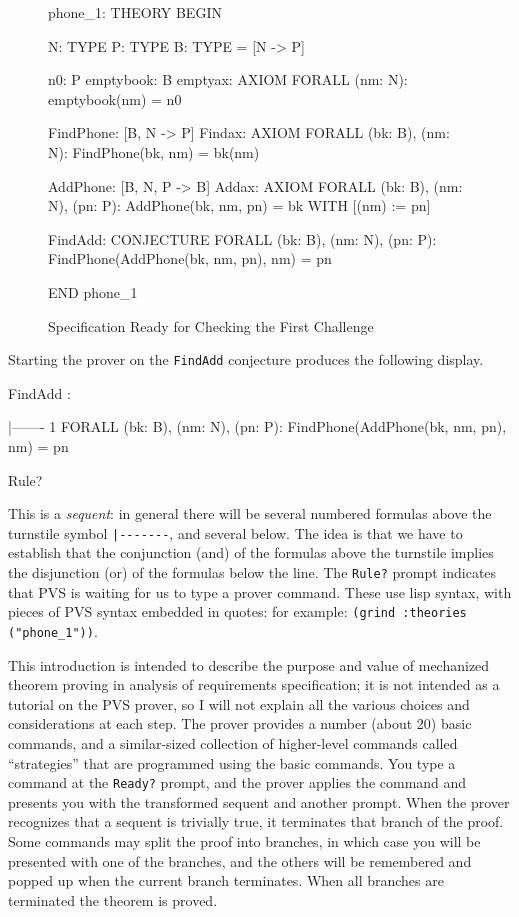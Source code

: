 \begin{figure}[htbp]
\begin{pvsexample}
phone_1: THEORY
BEGIN

  N: TYPE              %
  P: TYPE              %
  B: TYPE = [N -> P]   %

  n0: P
  emptybook: B
  emptyax: AXIOM   FORALL (nm: N): emptybook(nm) = n0

  FindPhone: [B, N -> P]
  Findax: AXIOM   FORALL (bk: B), (nm: N):  FindPhone(bk, nm) = bk(nm)

  AddPhone: [B, N, P -> B]
  Addax: AXIOM   FORALL (bk: B), (nm: N), (pn: P): 
     AddPhone(bk, nm, pn) = bk WITH [(nm) := pn]

  FindAdd: CONJECTURE  FORALL (bk: B), (nm: N), (pn: P):
    FindPhone(AddPhone(bk, nm, pn), nm) = pn

END phone_1
\end{pvsexample}
\caption{\label{fig1}Specification Ready for Checking the First Challenge}
\end{figure}

Starting the prover on the {\tt FindAdd} conjecture produces the following
display.
\begin{pvsexample}
FindAdd :  

  |-------
{1}   FORALL (bk: B), (nm: N), (pn: P): 
        FindPhone(AddPhone(bk, nm, pn), nm) = pn

Rule? 
\end{pvsexample}
This is a \emph{sequent}: in general there will be several numbered
formulas above the turnstile symbol \verb!|-------!, and several below.
The idea is that we have to establish that the conjunction (and) of the
formulas above the turnstile implies the disjunction (or) of the
formulas below the line.  The {\tt Rule?} prompt indicates that PVS is
waiting for us to type a prover command.  These use lisp syntax, with
pieces of PVS syntax embedded in quotes: for example:
\mbox{\tt (grind :theories ("phone\_1"))}.

This introduction is intended to describe the purpose and value of
mechanized theorem proving in analysis of requirements specification;
it is not intended as a tutorial on the PVS prover, so I will not
explain all the various choices and considerations at each step.  The
prover provides a number (about 20) basic commands, and a
similar-sized collection of higher-level commands called
``strategies'' that are programmed using the basic commands.  You type
a command at the {\tt Ready?} prompt, and the prover applies the
command and presents you with the transformed sequent and another
prompt.  When the prover recognizes that a sequent is trivially true,
it terminates that branch of the proof.  Some commands may split the
proof into branches, in which case you will be presented with one of
the branches, and the others will be remembered and popped up when the
current branch terminates.  When all branches are terminated the
theorem is proved.

